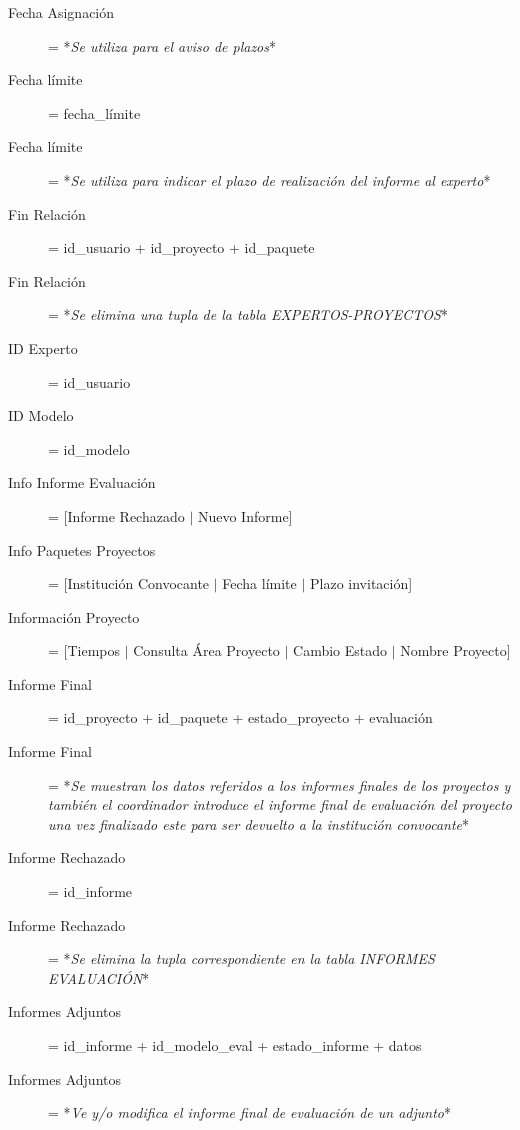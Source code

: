 \documentclass[12pt,a4paper,titlepage,spanish,twoside]{book}
\begin{document}
\begin{description}
\item[Fecha Asignación] = *\emph{Se utiliza para el aviso de plazos}*

\item[Fecha límite] = fecha\_límite

\item[Fecha límite] = *\emph{Se utiliza para indicar el plazo de realización
    del informe al experto}* 

\item[Fin Relación] = id\_usuario + id\_proyecto + id\_paquete

\item[Fin Relación] = *\emph{Se elimina una tupla de la tabla
    EXPERTOS-PROYECTOS}* 

\item[ID Experto] = id\_usuario

\item[ID Modelo] = id\_modelo

\item[Info Informe Evaluación] = [Informe Rechazado $\mid$ Nuevo Informe]

\item[Info Paquetes Proyectos] = [Institución Convocante $\mid$ Fecha límite
  $\mid$ Plazo invitación] 

\item[Información Proyecto] = [Tiempos $\mid$ Consulta Área Proyecto $\mid$
  Cambio Estado $\mid$ Nombre Proyecto] 

\item[Informe Final] = id\_proyecto + id\_paquete + estado\_proyecto +
  evaluación 

\item[Informe Final] = *\emph{Se muestran los datos referidos a los informes
    finales de los proyectos y también el coordinador introduce el informe
    final de evaluación del proyecto una vez finalizado este para ser
    devuelto a la institución convocante}* 

\item[Informe Rechazado] = id\_informe

\item[Informe Rechazado] = *\emph{Se elimina la tupla correspondiente en la
    tabla INFORMES EVALUACIÓN}* 

\item[Informes Adjuntos] = id\_informe + id\_modelo\_eval + estado\_informe +
  datos 

\item[Informes Adjuntos] = *\emph{Ve y/o modifica el informe final de
    evaluación de un adjunto}* 


\end{description}
\end{document}
